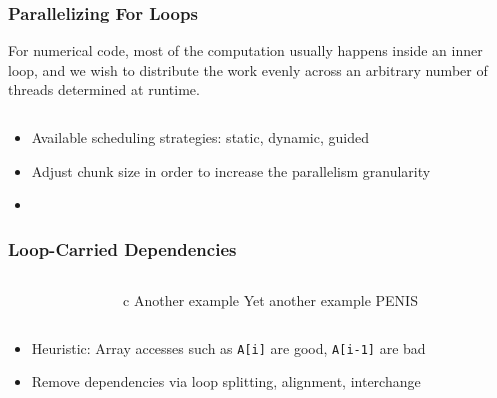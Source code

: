 \documentclass[handout]{beamer}
\begin{document}
\begin{frame}[fragile]
  \frametitle{Parallelizing For Loops}
  For numerical code, most of the computation usually happens inside an inner loop, and we wish to distribute the work evenly across an arbitrary number of threads determined at runtime.
  \begin{columns}[t]%
    \begin{column}{0.65\textwidth}
    \end{column}
    \pause
    \begin{column}{0.4\textwidth}
    \end{column}
  \end{columns}
  \pause
  \begin{itemize}
  \item Available scheduling strategies: static, dynamic, guided
  \item Adjust chunk size in order to increase the parallelism granularity
  \item  
  \end{itemize}
\end{frame}



\begin{frame}[fragile]
  \frametitle{Loop-Carried Dependencies}
  \begin{columns}[t]%
    \begin{column}{0.65\textwidth}
    \end{column}
    \pause
    \begin{column}{0.4\textwidth}
      \begin{ccode}[]
        {c}
        Another example
        Yet another example
        PENIS

      \end{ccode}
    \end{column}
  \end{columns}
  \pause
  \begin{itemize}
  \item Heuristic: Array accesses such as \texttt{A[i]} are good, \texttt{A[i-1]} are bad
  \item Remove dependencies via loop splitting, alignment, interchange
  \end{itemize}
\end{frame}
\end{document}
